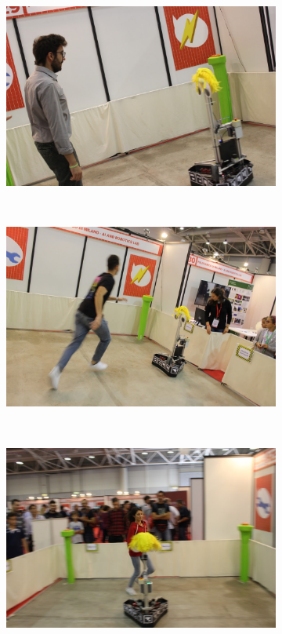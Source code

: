 \begin{figure}[h]
    \centering 
    \begin{subfigure}[h]{0.49\columnwidth}
        \centering
        \includegraphics[width=\linewidth]{images/06-deception/mfI}
        \caption{}
    \end{subfigure}
    ~
    \begin{subfigure}[h]{0.49\columnwidth}
        \centering
        \includegraphics[width=\linewidth]{images/06-deception/mfII}
        \caption{}
    \end{subfigure}
    ~
    \begin{subfigure}[h]{0.49\columnwidth}
        \centering
        \includegraphics[width=\linewidth]{images/06-deception/mfIII}

\end{subfigure}
\end{figure}

